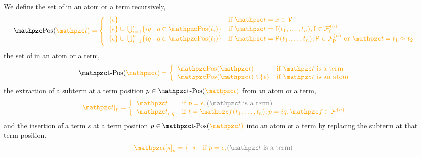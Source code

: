 \begin{definition}

	We define the set of  in an atom or a term recursively,
	\begin{gather*}
	\MDEFINE{\pos(\foxt) }{ll}{
		\{ \epsilon \}
		& \text{if }\foxt = x \in \mcV
		\\
		\{ \epsilon \} \cup \, \bigcup_{i=1}^{n} \{ iq\mid q\in\pos(t_i) \}
		&	\text{if }\foxt=\mf(t_1,\ldots,t_n), \mf\in\mcFfn
		\\
		\{ \epsilon \} \cup \, \bigcup_{i=1}^{n} \{ iq\mid q\in\pos(t_i) \}
		&	\text{if } \foxt=\mP(t_1,\ldots,t_n), \mP\in\mcFPn\text{ or }\foxt=t_1\mEQ t_2
		\\[0.5em]
	}
	\end{gather*}
	the set of  in an atom or a term,
	\begin{gather*}
	\MDEFINE{\posT(\foxt)}{ll}{
		\pos(\foxt)
		& \text{if }\foxt\text{ is a term}
		\\
		\pos(\foxt) \setminus \{ \epsilon \}
		& \text{if }\foxt\text{ is an atom}
	}
	\end{gather*}
	the extraction of a subterm at a term position \( p\in\posT(\foxt) \) from an atom or a term,
%
\begin{gather*}
	\MDEFINE{\foxt|_p}{ll}{
		\foxt 		& \text{if }p=\epsilon, \colG(\mct\text{ is a term}) \\
		\foxt_i|_q	& \text{if }t=\foxf(t_1,\ldots,t_n), p=iq, \foxf\in\mcFn
	}
\end{gather*}
	and the insertion of a term \( s \) at a term position \( p\in\posT(\foxt) \) into an atom or a term
	by replacing the subterm at that term position.
	\begin{gather*}
	\MDEFINE{\foxt{[s]}_p}{ll}{
		s 		& \text{if }p=\epsilon, \colG(\mct\text{ is a term}) \\
}
\end{gather*}
\end{definition}
